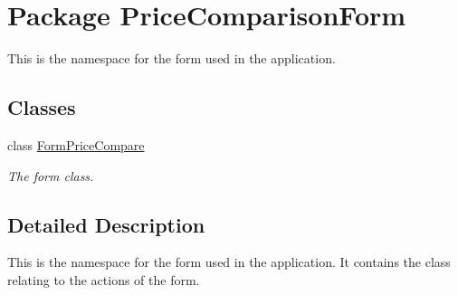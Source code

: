 \hypertarget{namespace_price_comparison_form}{\section{Package Price\-Comparison\-Form}
\label{namespace_price_comparison_form}
}


This is the namespace for the form used in the application.  


\subsection*{Classes}
\begin{DoxyCompactItemize}
\item 
class \hyperlink{class_price_comparison_form_1_1_form_price_compare}{Form\-Price\-Compare}
\begin{DoxyCompactList}\small\item\em The form class. \end{DoxyCompactList}\end{DoxyCompactItemize}


\subsection{Detailed Description}
This is the namespace for the form used in the application. It contains the class relating to the actions of the form. 